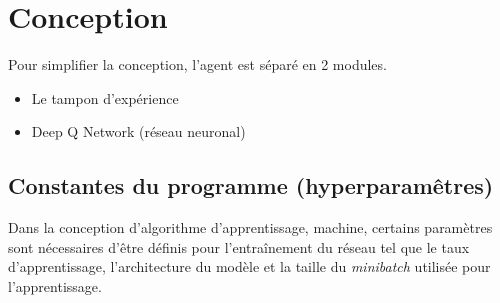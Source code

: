 \documentclass{article}
\begin{document}

%

\section{Conception}

Pour simplifier la conception, l'agent est séparé en 2 modules.
\begin{itemize}
  \item Le tampon d'expérience
  \item Deep Q Network (réseau neuronal)
\end{itemize}

\subsection{Constantes du programme (hyperparamêtres)}
Dans la conception d'algorithme d'apprentissage, machine, certains paramètres sont nécessaires d'être définis pour l'entraînement du réseau tel que le taux d'apprentissage, l'architecture du modèle et la taille du \textit{minibatch} utilisée pour l'apprentissage.
\end{document}

